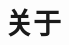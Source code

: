\documentclass[../../dolphin-book-2023.tex]{subfiles}
\begin{document}
\section{关于}


\end{document}
